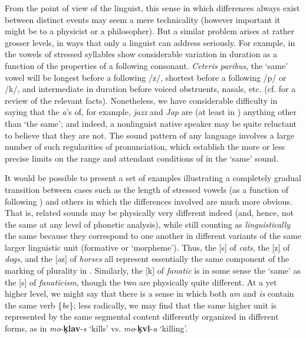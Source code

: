 From the point of view of the linguist, this sense in which
differences always exist between distinct events may seem a mere
technicality (however important it might be to a physicist or a
philosopher). But a similar problem arises at rather grosser {levels},
in ways that only a linguist can address seriously. For example, in
 the vowels of stressed syllables show considerable {variation}
in duration as a function of the properties of a following
consonant. \emph{Ceteris paribus}, the ‘same' vowel will be longest
before a following /z/, shortest before a following /p/ or /k/, and
intermediate in duration before voiced obstruents, nasals,
etc. (cf. \citealt{lehiste70:suprasegmentals} for a review of the
relevant facts). Nonetheless, we have considerable difficulty in
saying that the \emph{a}'s of, for example, \emph{jazz} and
\emph{Jap} are (at least in ) anything other than ‘the same';
and indeed, a nonlinguist native speaker may be quite reluctant to
believe that they are not. The sound pattern of any language involves
a large number of such {regularities} of pronunciation, which establish
the more or less precise limits on the range and attendant conditions
of  in the ‘same' sound.

It would be possible to present a set of examples illustrating a
completely gradual transition between cases such as the length of
 stressed vowels (as a function of following ) and
others in which the differences involved are much more obvious. That
is, related sounds may be physically very different indeed (and,
hence, not the same at any level of phonetic analysis), while still
counting as \emph{linguistically} the same because they correspond to
one another in different variants of the same larger linguistic unit
(formative or `morpheme'). Thus, the [s] of \emph{cats}, the [z] of
\emph{dogs}, and the [{ə}z] of \emph{horses} all represent
essentially the same component of the marking of plurality in
. Similarly, the [k] of \emph{fanatic} is in some sense the
‘same' as the [s] of \emph{fanaticism}, though the two are physically
quite different. At a yet higher level, we might say that there is a
sense in which both \emph{am} and \emph{is} contain the same verb
\{\emph{be}\}; less radically, we may find that the same higher unit
is represented by the same segmental content differently organized in
different forms, as in  \emph{mo}-\textbf{\d{k}lav}-\emph{s}
‘kills' vs. \emph{mo}-\textbf{\d{k}vl}-\emph{a} ‘killing'.

